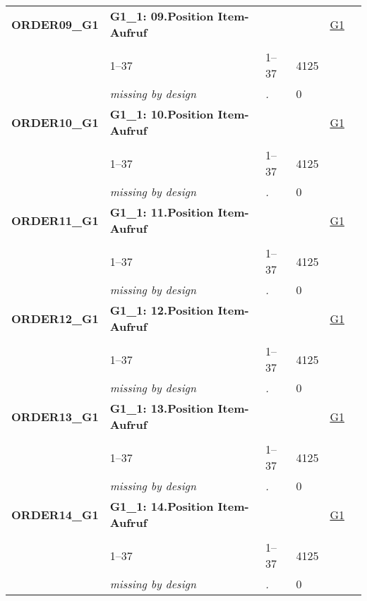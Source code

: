 \begin{longtable}{| L{2.45cm} | L{6cm} | C{1.5cm} | R{1cm} | C{2.25cm} | C{2.25cm} |}
   \midrule
\textbf{ORDER09\_G1}\label{var:ORDER09:G1} & \textbf{G1\_1: 09.Position Item-Aufruf} &  &  & \hyperref[G1]{G1} & \hyperref[var:suf:]{} \\ 
   &  &  &  &  &  \\ 
   & 1--37 & 1--37 & 4125 &  &  \\ 
   & \textit{missing by design} & \textit{.} & 0 &  &  \\ 
   \midrule
\textbf{ORDER10\_G1}\label{var:ORDER10:G1} & \textbf{G1\_1: 10.Position Item-Aufruf} &  &  & \hyperref[G1]{G1} & \hyperref[var:suf:]{} \\ 
   &  &  &  &  &  \\ 
   & 1--37 & 1--37 & 4125 &  &  \\ 
   & \textit{missing by design} & \textit{.} & 0 &  &  \\ 
   \midrule
\textbf{ORDER11\_G1}\label{var:ORDER11:G1} & \textbf{G1\_1: 11.Position Item-Aufruf} &  &  & \hyperref[G1]{G1} & \hyperref[var:suf:]{} \\ 
   &  &  &  &  &  \\ 
   & 1--37 & 1--37 & 4125 &  &  \\ 
   & \textit{missing by design} & \textit{.} & 0 &  &  \\ 
   \midrule
\textbf{ORDER12\_G1}\label{var:ORDER12:G1} & \textbf{G1\_1: 12.Position Item-Aufruf} &  &  & \hyperref[G1]{G1} & \hyperref[var:suf:]{} \\ 
   &  &  &  &  &  \\ 
   & 1--37 & 1--37 & 4125 &  &  \\ 
   & \textit{missing by design} & \textit{.} & 0 &  &  \\ 
   \midrule
\textbf{ORDER13\_G1}\label{var:ORDER13:G1} & \textbf{G1\_1: 13.Position Item-Aufruf} &  &  & \hyperref[G1]{G1} & \hyperref[var:suf:]{} \\ 
   &  &  &  &  &  \\ 
   & 1--37 & 1--37 & 4125 &  &  \\ 
   & \textit{missing by design} & \textit{.} & 0 &  &  \\ 
   \midrule
\textbf{ORDER14\_G1}\label{var:ORDER14:G1} & \textbf{G1\_1: 14.Position Item-Aufruf} &  &  & \hyperref[G1]{G1} & \hyperref[var:suf:]{} \\ 
   &  &  &  &  &  \\ 
   & 1--37 & 1--37 & 4125 &  &  \\ 
   & \textit{missing by design} & \textit{.} & 0 &  &  \\ 

\end{longtable}
